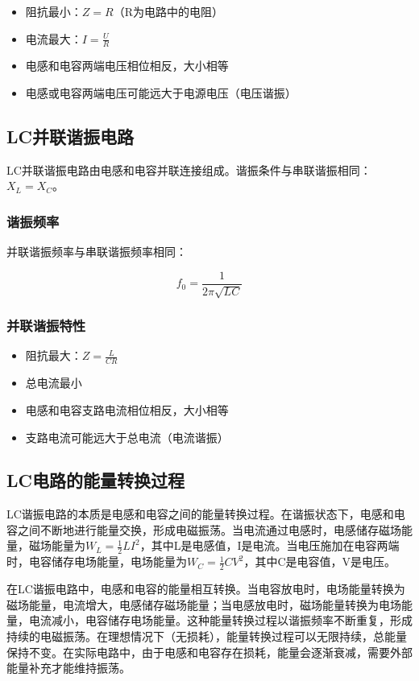 \documentclass[12pt,UTF8]{ctexbook}
\begin{document}
\begin{itemize}[leftmargin=3.5em]
    \item 阻抗最小：$Z = R$（R为电路中的电阻）
    \item 电流最大：$I = \frac{U}{R}$
    \item 电感和电容两端电压相位相反，大小相等
    \item 电感或电容两端电压可能远大于电源电压（电压谐振）
\end{itemize}

\subsection{LC并联谐振电路}

LC并联谐振电路由电感和电容并联连接组成。谐振条件与串联谐振相同：$X_L = X_C$。

\subsubsection{谐振频率}

并联谐振频率与串联谐振频率相同：

\[ f_0 = \frac{1}{2\pi \sqrt{LC}} \]

\subsubsection{并联谐振特性}

\begin{itemize}[leftmargin=3.5em]
    \item 阻抗最大：$Z = \frac{L}{CR}$
    \item 总电流最小
    \item 电感和电容支路电流相位相反，大小相等
    \item 支路电流可能远大于总电流（电流谐振）
\end{itemize}

\subsection{LC电路的能量转换过程}

LC谐振电路的本质是电感和电容之间的能量转换过程。在谐振状态下，电感和电容之间不断地进行能量交换，形成电磁振荡。当电流通过电感时，电感储存磁场能量，磁场能量为$W_L = \frac{1}{2}LI^2$，其中L是电感值，I是电流。当电压施加在电容两端时，电容储存电场能量，电场能量为$W_C = \frac{1}{2}CV^2$，其中C是电容值，V是电压。

在LC谐振电路中，电感和电容的能量相互转换。当电容放电时，电场能量转换为磁场能量，电流增大，电感储存磁场能量；当电感放电时，磁场能量转换为电场能量，电流减小，电容储存电场能量。这种能量转换过程以谐振频率不断重复，形成持续的电磁振荡。在理想情况下（无损耗），能量转换过程可以无限持续，总能量保持不变。在实际电路中，由于电感和电容存在损耗，能量会逐渐衰减，需要外部能量补充才能维持振荡。
\end{document}
